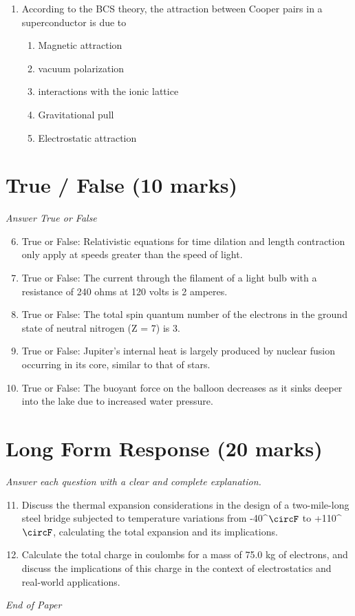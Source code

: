 \documentclass[12pt]{article}
\begin{document}
\begin{enumerate}[label=\arabic*.]
\begin{enumerate}[label=(\alph*)]
    \item 2 f\_2
    \item (3 f\_2) / 3
\end{enumerate}
\item According to the BCS theory, the attraction between Cooper pairs in a superconductor is due to
\begin{enumerate}[label=(\alph*)]
    \item Magnetic attraction
    \item vacuum polarization
    \item interactions with the ionic lattice
    \item Gravitational pull
    \item Electrostatic attraction
\end{enumerate}
\end{enumerate}

\section*{True / False (10 marks)}
\textit{Answer True or False}
\begin{enumerate}[label=\arabic*.]
\setcounter{enumi}{5}
\item True or False: Relativistic equations for time dilation and length contraction only apply at speeds greater than the speed of light.
\item True or False: The current through the filament of a light bulb with a resistance of 240 ohms at 120 volts is 2 amperes.
\item True or False: The total spin quantum number of the electrons in the ground state of neutral nitrogen (Z = 7) is 3.
\item True or False: Jupiter's internal heat is largely produced by nuclear fusion occurring in its core, similar to that of stars.
\item True or False: The buoyant force on the balloon decreases as it sinks deeper into the lake due to increased water pressure.
\end{enumerate}

\section*{Long Form Response (20 marks)}
\textit{Answer each question with a clear and complete explanation.}
\begin{enumerate}[label=\arabic*.]
\setcounter{enumi}{10}
\item Discuss the thermal expansion considerations in the design of a two-mile-long steel bridge subjected to temperature variations from -40^\ensuremath{\circF} to +110^\ensuremath{\circF}, calculating the total expansion and its implications.
\item Calculate the total charge in coulombs for a mass of 75.0 kg of electrons, and discuss the implications of this charge in the context of electrostatics and real-world applications.
\end{enumerate}

\vfill
\noindent\textit{End of Paper}
\end{document}
